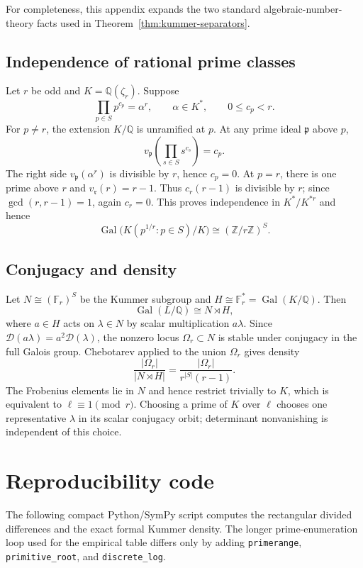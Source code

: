 \documentclass[11pt,oneside]{article}
\theoremstyle{definition}
\theoremstyle{remark}
\newcommand{\Z}{\mathbb Z}
\newcommand{\Q}{\mathbb Q}
\newcommand{\F}{\mathbb F}
\newcommand{\Gal}{\operatorname{Gal}}
\begin{document}
For completeness, this appendix expands the two standard algebraic-number-theory facts used
in Theorem~\ref{thm:kummer-separators}.

\subsection{Independence of rational prime classes}

Let $r$ be odd and $K=\Q(\zeta_r)$.  Suppose
\[
 \prod_{p\in S}p^{c_p}=\alpha^r,
 \qquad \alpha\in K^*,
 \qquad 0\le c_p<r.
\]
For $p\ne r$, the extension $K/\Q$ is unramified at $p$.  At any prime ideal
$\mathfrak p$ above $p$,
\[
 v_{\mathfrak p}\!\left(\prod_{s\in S}s^{c_s}\right)=c_p.
\]
The right side $v_{\mathfrak p}(\alpha^r)$ is divisible by $r$, hence $c_p=0$.  At $p=r$,
there is one prime above $r$ and $v_{\mathfrak r}(r)=r-1$.  Thus
$c_r(r-1)$ is divisible by $r$; since $\gcd(r,r-1)=1$, again $c_r=0$.
This proves independence in $K^*/K^{*r}$ and hence
\[
 \Gal\bigl(K(p^{1/r}:p\in S)/K\bigr)\cong(\Z/r\Z)^S.
\]

\subsection{Conjugacy and density}

Let $N\cong(\F_r)^S$ be the Kummer subgroup and
$H\cong\F_r^*=\Gal(K/\Q)$.  Then
\[
 \Gal(L/\Q)\cong N\rtimes H,
\]
where $a\in H$ acts on $\lambda\in N$ by scalar multiplication $a\lambda$.  Since
$\mathscr D(a\lambda)=a^2\mathscr D(\lambda)$, the nonzero locus
$\Omega_r\subset N$ is stable under conjugacy in the full Galois group.  Chebotarev applied
to the union $\Omega_r$ gives density
\[
 \frac{|\Omega_r|}{|N\rtimes H|}
 =\frac{|\Omega_r|}{r^{|S|}(r-1)}.
\]
The Frobenius elements lie in $N$ and hence restrict trivially to $K$, which is equivalent to
$\ell\equiv1\pmod r$.  Choosing a prime of $K$ over $\ell$ chooses one representative
$\lambda$ in its scalar conjugacy orbit; determinant nonvanishing is independent of this
choice.

\section{Reproducibility code}
\label{app:code}

The following compact Python/SymPy script computes the rectangular divided differences and
the exact formal Kummer density.  The longer prime-enumeration loop used for the empirical
table differs only by adding \texttt{primerange}, \texttt{primitive\_root}, and
\texttt{discrete\_log}.
\end{document}
